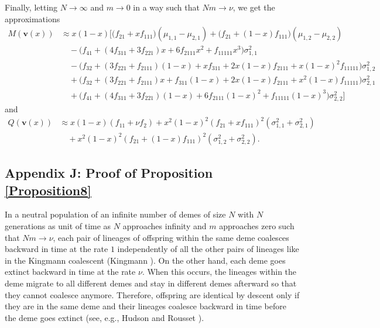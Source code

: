\documentclass[11pt]{article}
\begin{document}
Finally, letting $N\rightarrow\infty$ and $m\rightarrow 0$ in a way such that $Nm\rightarrow\nu$, we get the approximations
\begin{align}\label{AA-eq10}
M(\mathbf{v}(x))
&\approx x(1-x)\Bigg[\Big(f_{21}+xf_{111}\Big)\left(\mu_{1,1}-\mu_{2,1}\right)+\Big(f_{21}+(1-x)f_{111}\Big)\left(\mu_{1,2}-\mu_{2,2}\right)\nonumber\\
&\quad-\Big(f_{41}+(4f_{311}+3f_{221})x+6f_{2111}x^2
+f_{11111}x^3\Big)\sigma^2_{1,1}\nonumber\\
&\quad-\Big(f_{32}+\left(3f_{221}+f_{2111}\right)(1-x)+xf_{311}+2x(1-x)f_{2111}+x(1-x)^2f_{11111}\Big)\sigma^2_{1,2}\nonumber\\
&\quad+\Big(f_{32}+\left(3f_{221}+f_{2111}\right)x+f_{311}(1-x)+2x(1-x)f_{2111}+x^2(1-x)f_{11111}\Big)\sigma^2_{2,1}\nonumber\\
&\quad+\Big(f_{41}+(4f_{311}+3f_{221})(1-x)+6f_{2111}(1-x)^2+f_{11111}(1-x)^3\Big)\sigma^2_{2,2}\Bigg]%
\end{align}
and
\begin{align}\label{AA-eq11}
Q(\mathbf{v}(x))
&\approx x(1-x)(f_{11}+\nu f_{2})+x^2(1-x)^2\left(f_{21}+xf_{111}\right)^2\left(\sigma^2_{1,1}+\sigma^2_{2,1}\right)\nonumber\\
&\quad+x^2(1-x)^2\left(f_{21}+(1-x)f_{111}\right)^2\left(\sigma^2_{1,2}+\sigma^2_{2,2}\right).%
\end{align}

\subsection*{Appendix J: Proof of Proposition \ref{Proposition8}}


In a neutral population of an infinite number of demes of size $N$ with $N$ generations as unit of time as $N$ approaches infinity and $m$ approaches zero such that $Nm\rightarrow\nu$, each pair of lineages of offspring within the same deme coalesces  backward in time at the rate $1$ independently of all the other pairs of lineages like in the Kingmann coalescent (Kingmann \cite{K1982}).  On the other hand, each deme goes extinct backward in time at the rate  $\nu$. When this occurs, the lineages within the deme migrate to all different demes and stay in different demes afterward so that they cannot coalesce anymore. Therefore, offspring are identical by descent only if they are in the same deme and their lineages coalesce backward in time before the deme goes extinct (see, e.g., Hudson \cite{H1998} and Rousset \cite{R2002}).
\end{document}
